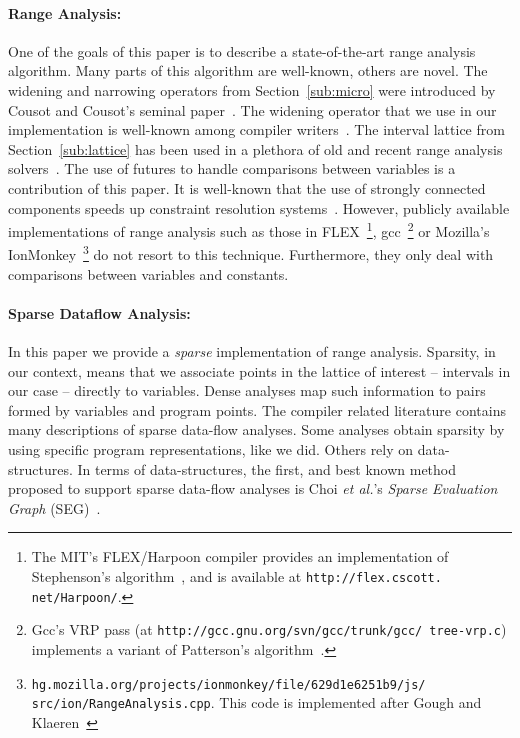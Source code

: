 \documentclass[preprint]{sigplanconf}[10pt]
\begin{document}
\paragraph{Range Analysis:}
One of the goals of this paper is to describe a state-of-the-art range analysis
algorithm.
Many parts of this algorithm are well-known, others are novel.
The widening and narrowing operators from Section~\ref{sub:micro} were
introduced by Cousot and Cousot's seminal paper~\cite{Cousot77}.
The widening operator that we use in our implementation is well-known among
compiler writers~\cite[p.228]{Nielson99}.
The interval lattice from Section~\ref{sub:lattice} has been used in a
plethora of old and recent range analysis
solvers~\cite{Gough94,Mahlke01,Oh12,Patterson95,Stephenson00,Su05}.
The use of futures to handle comparisons between variables is a contribution
of this paper.
It is well-known that the use of strongly connected components speeds up
constraint resolution systems~\cite[Sec 6.3]{Nielson99}.
However, publicly available implementations of range analysis such as those in
FLEX~\footnote{The MIT's FLEX/Harpoon compiler
provides an implementation of Stephenson's algorithm~\cite{Stephenson00}, and
is available at \texttt{http://flex.cscott. net/Harpoon/}.},
gcc~\footnote{Gcc's VRP pass (at \texttt{http://gcc.gnu.org/svn/gcc/trunk/gcc/
tree-vrp.c}) implements a variant of Patterson's
algorithm~\cite{Patterson95}.} or Mozilla's IonMonkey~\footnote{\texttt{hg.mozilla.org/projects/ionmonkey/file/629d1e6251b9/js/
src/ion/RangeAnalysis.cpp}. This code is implemented after Gough and
Klaeren~\cite{Gough94}} do not resort to this technique.
Furthermore, they only deal with comparisons between variables and constants.


\noindent
\paragraph{Sparse Dataflow Analysis: }
In this paper we provide a {\em sparse} implementation of range analysis.
Sparsity, in our context, means that we associate points in the lattice of
interest -- intervals in our case -- directly to variables.
Dense analyses map such information to pairs formed by variables and program
points.
The compiler related literature contains many descriptions of sparse
data-flow analyses.
Some analyses obtain sparsity by using specific program
representations, like we did.
Others rely on data-structures.
In terms of data-structures, the first, and best known method proposed to
support sparse data-flow analyses is Choi {\em et al.}'s {\em Sparse Evaluation
Graph} (SEG)~\cite{Choi91}.
\end{document}
